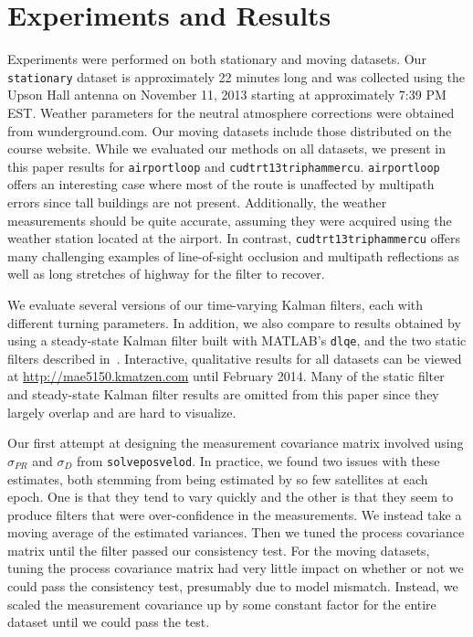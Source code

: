 \section{Experiments and Results}\label{sec:experiments}
Experiments were performed on both stationary and moving datasets.  Our \texttt{stationary} dataset is approximately 22 minutes long and was collected using the Upson Hall antenna on November 11, 2013 starting at approximately 7:39 PM EST.  Weather parameters for the neutral atmosphere corrections were obtained from wunderground.com.  Our moving datasets include those distributed on the course website.  While we evaluated our methods on all datasets, we present in this paper results for \texttt{airportloop} and \texttt{cudtrt13triphammercu}. \texttt{airportloop} offers an interesting case where most of the route is unaffected by multipath errors since tall buildings are not present.  Additionally, the weather measurements should be quite accurate, assuming they were acquired using the weather station located at the airport.  In contrast, \texttt{cudtrt13triphammercu} offers many challenging examples of line-of-sight occlusion and multipath reflections as well as long stretches of highway for the filter to recover.

We evaluate several versions of our time-varying Kalman filters, each with different turning parameters.  In addition, we also compare to results obtained by using a steady-state Kalman filter built with MATLAB's \texttt{dlqe}, and the two static filters described in~\cite{course}.  Interactive, qualitative results for all datasets can be viewed at \url{http://mae5150.kmatzen.com} until February 2014.  Many of the static filter and steady-state Kalman filter results are omitted from this paper since they largely overlap and are hard to visualize.

Our first attempt at designing the measurement covariance matrix involved using $\sigma_{PR}$ and $\sigma_D$ from \texttt{solveposvelod}.  In practice, we found two issues with these estimates, both stemming from being estimated by so few satellites at each epoch.  One is that they tend to vary quickly and the other is that they seem to produce filters that were over-confidence in the measurements.  We instead take a moving average of the estimated variances.  Then we tuned the process covariance matrix until the filter passed our consistency test.  For the moving datasets, tuning the process covariance matrix had very little impact on whether or not we could pass the consistency test, presumably due to model mismatch.  Instead, we scaled the measurement covariance up by some constant factor for the entire dataset until we could pass the test.

